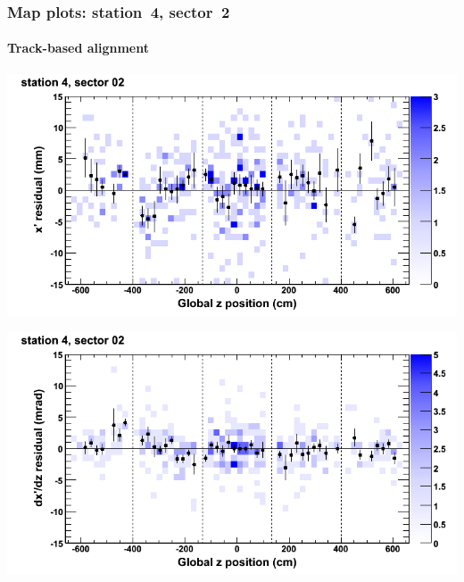 \documentclass[compress]{beamer}
\begin{document}
\begin{frame}
\frametitle{Map plots: station~4, sector~2}
\framesubtitle{Track-based alignment}
\includegraphics[width=0.5\linewidth]{mapplots_re05/DTvsz_st4sec02_x.png}

\includegraphics[width=0.5\linewidth]{mapplots_re05/DTvsz_st4sec02_dxdz.png}
\end{frame}
\end{document}
